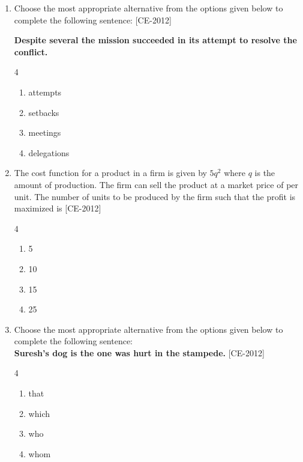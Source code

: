 \documentclass[journal]{IEEEtran}
\begin{document}
\begin{enumerate}
\textbf{General Aptitude $\brak{GA}$ Questions} 
 
 \item Choose the most appropriate alternative from the options given below to complete the following sentence: \hfill{[CE-2012]}
            
           \textbf{Despite several \underline{\hspace{2cm}} the mission succeeded in its attempt to resolve the conflict.} \\
            \begin{multicols}{4}
            \begin{enumerate}
                \item attempts
                \item setbacks
                \item meetings
                \item delegations
            \end{enumerate}
                
            \end{multicols}
            \item The cost function for a product in a firm is given by $5q^2$ where $q$ is the amount of production. The firm can sell the product at a market price of  per unit.  The number of units to be produced  by  the firm such that the profit is maximized is                \hfill{[CE-2012]}
\begin{multicols}{4}
    

    \begin{enumerate}
        \item 5
        \item 10
        \item 15
        \item 25
    \end{enumerate} 
    \end{multicols}
\item Choose the most appropriate alternative from the options given below to complete the following sentence:\\

   \textbf{Suresh's dog is the one \underline{\hspace{2cm}} was hurt in the stampede. } \hfill{[CE-2012]}
\begin{multicols}{4}
    

    \begin{enumerate}
        \item that
        \item which
        \item who
        \item whom
    \end{enumerate}
    \end{multicols}


\end{enumerate}
\end{document}
